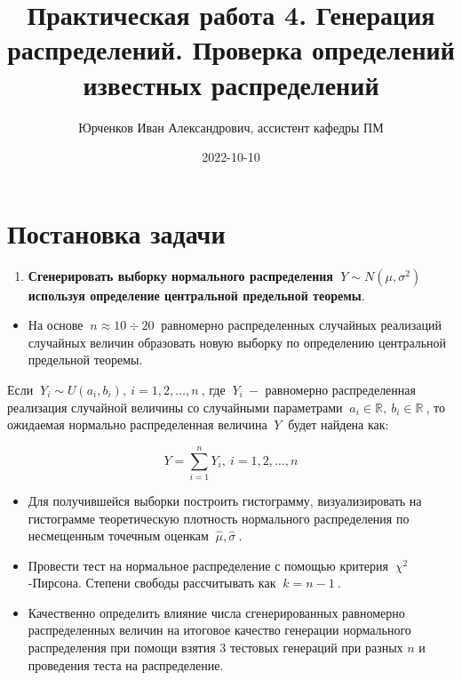 \documentclass[
]{article}
\title{Практическая работа 4. Генерация распределений. Проверка
определений известных распределений}
\author{Юрченков Иван Александрович, ассистент кафедры ПМ}
\date{2022-10-10}
\providecommand{\tightlist}{%
  \setlength{\itemsep}{0pt}\setlength{\parskip}{0pt}}
\begin{document}
\maketitle

\hypertarget{ux43fux43eux441ux442ux430ux43dux43eux432ux43aux430-ux437ux430ux434ux430ux447ux438}{%
\section{\texorpdfstring{\textbf{Постановка
задачи}}{Постановка задачи}}\label{ux43fux43eux441ux442ux430ux43dux43eux432ux43aux430-ux437ux430ux434ux430ux447ux438}}

\begin{enumerate}
\def\labelenumi{\arabic{enumi}.}
\tightlist
\item
  \textbf{Сгенерировать выборку нормального распределения
  \(\ Y\sim N(\mu, \sigma^2)\ \) используя определение центральной
  предельной теоремы}.
\end{enumerate}

\begin{itemize}
\tightlist
\item
  На основе \(\ n \approx 10\div 20\ \) равномерно распределенных
  случайных реализаций случайных величин образовать новую выборку по
  определению центральной предельной теоремы.
\end{itemize}

Если \(\ Y_{i} \sim U(a_i, b_i), \ i = 1, 2, \dots, n\ \), где
\(\ Y_{i}\ -\) равномерно распределенная реализация случайной величины
со случайными параметрами
\(\ a_i \in \mathbb{R},\ b_i \in \mathbb{R}\ \), то ожидаемая нормально
распределенная величина \(\ Y\ \) будет найдена как:

\[
Y = \sum_{i=1}^{n} Y_i, \ i=1,2,\dots, n
\]

\begin{itemize}
\item
  Для получившейся выборки построить гистограмму, визуализировать на
  гистограмме теоретическую плотность нормального распределения по
  несмещенным точечным оценкам \(\ \hat{\mu}, \hat{\sigma}\ \).
\item
  Провести тест на нормальное распределение с помощью критерия
  \(\ \chi^2\)-Пирсона. Степени свободы рассчитывать как
  \(\ k = n - 1\ \).
\item
  Качественно определить влияние числа сгенерированных равномерно
  распределенных величин на итоговое качество генерации нормального
  распределения при помощи взятия 3 тестовых генераций при разных \(n\)
  и проведения теста на распределение.
\end{itemize}
\end{document}
